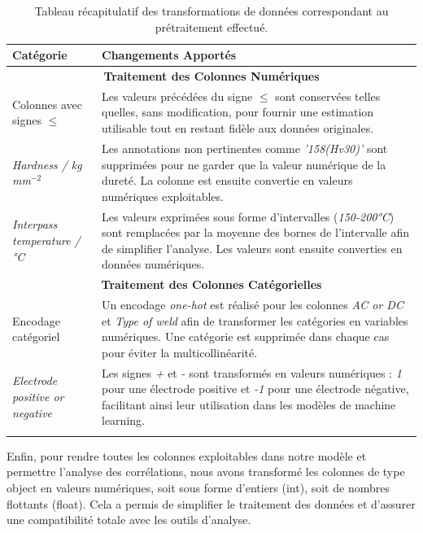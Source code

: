 \documentclass{article}
\begin{document}
\begin{longtable}{|p{4cm}|p{10cm}|}
\hline
\textbf{Catégorie} & \textbf{Changements Apportés} \\ \hline
\multicolumn{2}{|c|}{\textbf{Traitement des Colonnes Numériques}} \\ \hline
Colonnes avec signes $\leq$ & Les valeurs précédées du signe $\leq$ sont conservées telles quelles, sans modification, pour fournir une estimation utilisable tout en restant fidèle aux données originales. \\ \hline
\textit{Hardness / kg mm$^{-2}$} & Les annotations non pertinentes comme \textit{'158(Hv30)'} sont supprimées pour ne garder que la valeur numérique de la dureté. La colonne est ensuite convertie en valeurs numériques exploitables. \\ \hline
\textit{Interpass temperature / °C} & Les valeurs exprimées sous forme d’intervalles (\textit{150-200°C}) sont remplacées par la moyenne des bornes de l'intervalle afin de simplifier l'analyse. Les valeurs sont ensuite converties en données numériques. \\ \hline

\multicolumn{2}{|c|}{\textbf{Traitement des Colonnes Catégorielles}} \\ \hline
Encodage catégoriel & Un encodage \textit{one-hot} est réalisé pour les colonnes \textit{AC or DC} et \textit{Type of weld} afin de transformer les catégories en variables numériques. Une catégorie est supprimée dans chaque cas pour éviter la multicollinéarité. \\ \hline
\textit{Electrode positive or negative} & Les signes \textit{+} et \textit{-} sont transformés en valeurs numériques : \textit{1} pour une électrode positive et \textit{-1} pour une électrode négative, facilitant ainsi leur utilisation dans les modèles de machine learning. \\ \hline

\caption{Tableau récapitulatif des transformations de données correspondant au prétraitement effectué.}
\end{longtable}

Enfin, pour rendre toutes les colonnes exploitables dans notre modèle et permettre l'analyse des corrélations, nous avons transformé les colonnes de type object en valeurs numériques, soit sous forme d'entiers (int), soit de nombres flottants (float). Cela a permis de simplifier le traitement des données et d'assurer une compatibilité totale avec les outils d'analyse.\\
\end{document}
